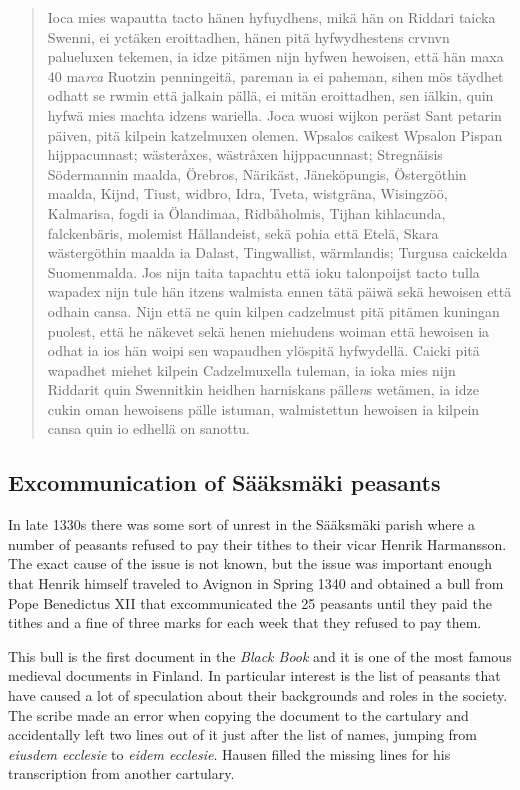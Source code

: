 \documentclass[a4paper]{article}
\begin{document}
\begin{quote}
  Ioca mies wapautta tacto hänen hyfuydhens, mikä hän on Riddari
  taicka Swenni, ei yctäken eroittadhen, hänen pitä hyfwydhestens
  crvnvn palueluxen tekemen, ia idze pitämen nijn hyfwen hewoisen,
  että hän maxa 40 ma\emph{rca} Ruotzin penningeitä, pareman ia ei
  paheman, sihen mös täydhet odhatt se rwmin että jalkain pällä, ei
  mitän eroittadhen, sen iälkin, quin hyfwä mies machta idzens
  wariella. Joca wuosi wijkon peräst Sant petarin päiven, pitä kilpein
  katzelmuxen olemen. Wpsalos caikest Wpsalon Pispan hijppacunnast;
  wästeråxes, wästråxen hijppacunnast; Stregnäisis Södermannin maal\-da,
  Örebros, Närikäst, Jäneköpungis, Östergöthin maalda, Kijnd, Tiust,
  widbro, Idra, Tveta, wistgräna, Wisingzöö, Kalmarisa, fogdi ia
  Ölandimaa, Ridbåholmis, Tijhan kihlacunda, falckenbäris, molemist
  Hållandeist, sekä pohia että Etelä, Skara wästergöthin maalda ia
  Dalast, Tingwallist, wärmlandis; Turgusa caickelda Suomenmalda. Jos
  nijn taita tapachtu että ioku talonpoijst tacto tulla wapadex nijn
  tule hän itzens walmista ennen tätä päiwä sekä hewoisen että odhain
  cansa. Nijn että ne quin kilpen cadzelmust pitä pitämen kuningan
  puolest, että he näkevet sekä henen miehudens woiman että hewoisen
  ia odhat ia ios hän woipi sen wapaudhen ylöspitä hyfwydellä. Caicki
  pitä wapadhet miehet kilpein Cadzelmuxella tuleman, ia ioka mies
  nijn Riddarit quin Swennitkin heidhen harniskans pälle\emph{n}s
  wetämen, ia idze cukin oman hewoisens pälle istuman, walmistettun
  hewoisen ia kilpein cansa quin io edhellä on sanottu.
\end{quote}


\subsection{Excommunication of Sääksmäki peasants}

In late 1330s there was some sort of unrest in the Sääksmäki parish
where a number of peasants refused to pay their tithes to their vicar
Henrik Harmansson. The exact cause of the issue is not known, but the
issue was important enough that Henrik himself traveled to Avignon in
Spring 1340 and obtained a bull from Pope Benedictus XII that
excommunicated the 25 peasants until they paid the tithes and a fine
of three marks for each week that they refused to pay them.

This bull is the first document in the \emph{Black Book} and it is one
of the most famous medieval documents in Finland. In particular
interest is the list of peasants that have caused a lot of speculation
about their backgrounds and roles in the society. The scribe made an
error when copying the document to the cartulary and accidentally left
two lines out of it just after the list of names, jumping from
\emph{eiusdem ecclesie} to \emph{eidem ecclesie}. Hausen filled the
missing lines for his transcription from another cartulary. 
\end{document}
